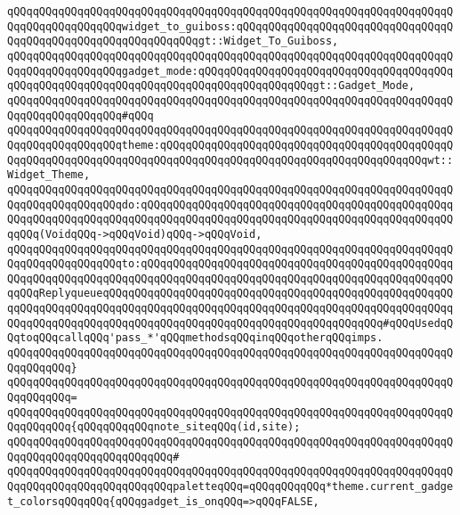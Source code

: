 \verb|qQQqqQQqqQQqqQQqqQQqqQQqqQQqqQQqqQQqqQQqqQQqqQQqqQQqqQQqqQQqqQQqqQQqqQQqqQQqqQQqqQQqqQQqwidget_to_guiboss:qQQqqQQqqQQqqQQqqQQqqQQqqQQqqQQqqQQqqQQqqQQqqQQqqQQqqQQqqQQqqQQqgt::Widget_To_Guiboss,|\newline
\verb|qQQqqQQqqQQqqQQqqQQqqQQqqQQqqQQqqQQqqQQqqQQqqQQqqQQqqQQqqQQqqQQqqQQqqQQqqQQqqQQqqQQqqQQqgadget_mode:qQQqqQQqqQQqqQQqqQQqqQQqqQQqqQQqqQQqqQQqqQQqqQQqqQQqqQQqqQQqqQQqqQQqqQQqqQQqqQQqqQQqqQQqgt::Gadget_Mode,|\newline
\verb|qQQqqQQqqQQqqQQqqQQqqQQqqQQqqQQqqQQqqQQqqQQqqQQqqQQqqQQqqQQqqQQqqQQqqQQqqQQqqQQqqQQqqQQq#qQQq|\newline
\verb|qQQqqQQqqQQqqQQqqQQqqQQqqQQqqQQqqQQqqQQqqQQqqQQqqQQqqQQqqQQqqQQqqQQqqQQqqQQqqQQqqQQqqQQqtheme:qQQqqQQqqQQqqQQqqQQqqQQqqQQqqQQqqQQqqQQqqQQqqQQqqQQqqQQqqQQqqQQqqQQqqQQqqQQqqQQqqQQqqQQqqQQqqQQqqQQqqQQqqQQqqQQqwt::Widget_Theme,|\newline
\verb|qQQqqQQqqQQqqQQqqQQqqQQqqQQqqQQqqQQqqQQqqQQqqQQqqQQqqQQqqQQqqQQqqQQqqQQqqQQqqQQqqQQqqQQqdo:qQQqqQQqqQQqqQQqqQQqqQQqqQQqqQQqqQQqqQQqqQQqqQQqqQQqqQQqqQQqqQQqqQQqqQQqqQQqqQQqqQQqqQQqqQQqqQQqqQQqqQQqqQQqqQQqqQQqqQQqqQQq(VoidqQQq->qQQqVoid)qQQq->qQQqVoid,|\newline
\verb|qQQqqQQqqQQqqQQqqQQqqQQqqQQqqQQqqQQqqQQqqQQqqQQqqQQqqQQqqQQqqQQqqQQqqQQqqQQqqQQqqQQqqQQqto:qQQqqQQqqQQqqQQqqQQqqQQqqQQqqQQqqQQqqQQqqQQqqQQqqQQqqQQqqQQqqQQqqQQqqQQqqQQqqQQqqQQqqQQqqQQqqQQqqQQqqQQqqQQqqQQqqQQqqQQqqQQqReplyqueueqQQqqQQqqQQqqQQqqQQqqQQqqQQqqQQqqQQqqQQqqQQqqQQqqQQqqQQqqQQqqQQqqQQqqQQqqQQqqQQqqQQqqQQqqQQqqQQqqQQqqQQqqQQqqQQqqQQqqQQqqQQqqQQqqQQqqQQqqQQqqQQqqQQqqQQqqQQqqQQqqQQqqQQqqQQqqQQqqQQqqQQq#qQQqUsedqQQqtoqQQqcallqQQq'pass_*'qQQqmethodsqQQqinqQQqotherqQQqimps.|\newline
\verb|qQQqqQQqqQQqqQQqqQQqqQQqqQQqqQQqqQQqqQQqqQQqqQQqqQQqqQQqqQQqqQQqqQQqqQQqqQQqqQQq}|\newline
\verb|qQQqqQQqqQQqqQQqqQQqqQQqqQQqqQQqqQQqqQQqqQQqqQQqqQQqqQQqqQQqqQQqqQQqqQQqqQQqqQQq=|\newline
\verb|qQQqqQQqqQQqqQQqqQQqqQQqqQQqqQQqqQQqqQQqqQQqqQQqqQQqqQQqqQQqqQQqqQQqqQQqqQQqqQQq{qQQqqQQqqQQqnote_siteqQQq(id,site);|\newline
\verb|qQQqqQQqqQQqqQQqqQQqqQQqqQQqqQQqqQQqqQQqqQQqqQQqqQQqqQQqqQQqqQQqqQQqqQQqqQQqqQQqqQQqqQQqqQQqqQQq#|\newline
\verb|qQQqqQQqqQQqqQQqqQQqqQQqqQQqqQQqqQQqqQQqqQQqqQQqqQQqqQQqqQQqqQQqqQQqqQQqqQQqqQQqqQQqqQQqqQQqqQQqpaletteqQQq=qQQqqQQqqQQq*theme.current_gadget_colorsqQQqqQQq{qQQqgadget_is_onqQQq=>qQQqFALSE,|\newline
